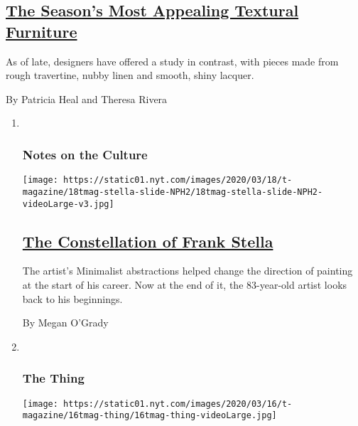 \begin{enumerate}
  \hypertarget{the-seasons-most-appealing-textural-furniture}{%
  \subsection{\texorpdfstring{\href{/2020/03/09/t-magazine/textural-furniture.html}{The
  Season's Most Appealing Textural
  Furniture}}{The Season's Most Appealing Textural Furniture}}\label{the-seasons-most-appealing-textural-furniture}}

  As of late, designers have offered a study in contrast, with pieces
  made from rough travertine, nubby linen and smooth, shiny lacquer.

  By Patricia Heal and Theresa Rivera
\end{enumerate}

\begin{enumerate}
\def\labelenumi{\arabic{enumi}.}
\item ~
  \hypertarget{notes-on-the-culture-1}{%
  \subsubsection{Notes on the Culture}\label{notes-on-the-culture-1}}

  \texttt{[image: https://static01.nyt.com/images/2020/03/18/t-magazine/18tmag-stella-slide-NPH2/18tmag-stella-slide-NPH2-videoLarge-v3.jpg]}

  \hypertarget{the-constellation-of-frank-stella}{%
  \subsection{\texorpdfstring{\href{/2020/03/18/t-magazine/frank-stella.html}{The
  Constellation of Frank
  Stella}}{The Constellation of Frank Stella}}\label{the-constellation-of-frank-stella}}

  The artist's Minimalist abstractions helped change the direction of
  painting at the start of his career. Now at the end of it, the
  83-year-old artist looks back to his beginnings.

  By Megan O'Grady
\item ~
  \hypertarget{the-thing}{%
  \subsubsection{The Thing}\label{the-thing}}

  \texttt{[image: https://static01.nyt.com/images/2020/03/16/t-magazine/16tmag-thing/16tmag-thing-videoLarge.jpg]}


\end{enumerate}
